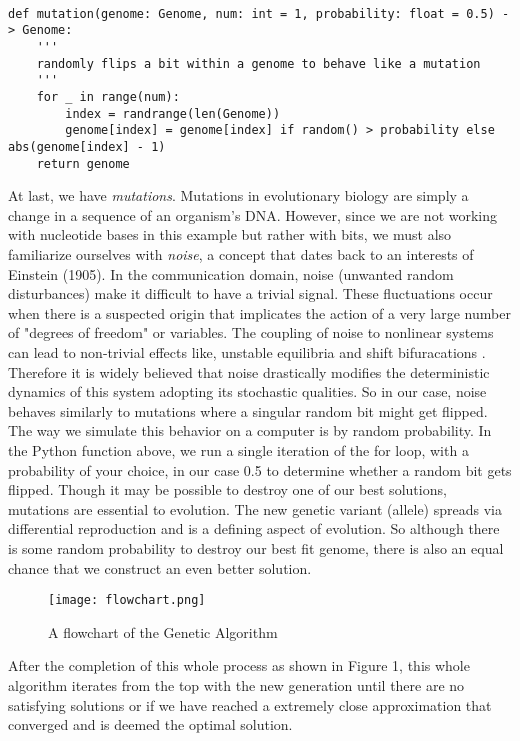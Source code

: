 \begin{lstlisting}

def mutation(genome: Genome, num: int = 1, probability: float = 0.5) -> Genome:
    '''
    randomly flips a bit within a genome to behave like a mutation
    '''
    for _ in range(num):
        index = randrange(len(Genome))
        genome[index] = genome[index] if random() > probability else abs(genome[index] - 1)
    return genome

\end{lstlisting} 

At last, we have \emph{mutations}. Mutations in evolutionary biology are simply a change in a sequence of an organism's DNA. However, since we are not working with nucleotide bases in this example but rather with bits, we must also familiarize ourselves with \emph{noise}, a concept that dates back to an interests of Einstein (1905). In the communication domain, noise (unwanted random disturbances) make it difficult to have a trivial signal. These fluctuations occur when there is a suspected origin that implicates the action of a very large number of "degrees of freedom" or variables. The coupling of noise to nonlinear systems can lead to non-trivial effects like, unstable equilibria and shift bifuracations \cite{Gammaitoni}. Therefore it is widely believed that noise drastically modifies the deterministic dynamics of this system adopting its stochastic qualities. So in our case, noise behaves similarly to mutations where a singular random bit might get flipped. The way we simulate this behavior on a computer is by random probability. In the Python function above, we run a single iteration of the for loop, with a probability of your choice, in our case 0.5 to determine whether a random bit gets flipped. Though it may be possible to destroy one of our best solutions, mutations are essential to evolution. The new genetic variant (allele) spreads via differential reproduction and is a defining aspect of evolution. So although there is some random probability to destroy our best fit genome, there is also an equal chance that we construct an even better solution. 

\begin{figure}[h]
\centering
\texttt{[image: flowchart.png]}
\caption{A flowchart of the Genetic Algorithm \cite{Gutierrez-Navaro}}
\end{figure}

After the completion of this whole process as shown in Figure 1, this whole algorithm iterates from the top with the new generation until there are no satisfying solutions or if we have reached a extremely close approximation that converged and is deemed the optimal solution.

